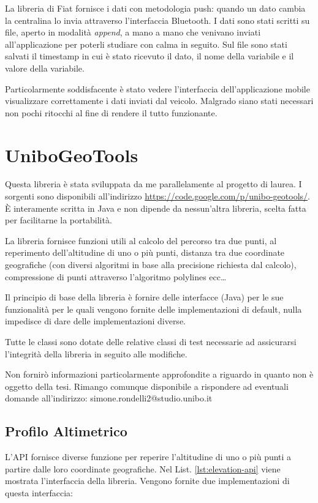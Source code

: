 La libreria di Fiat fornisce i dati con metodologia push: quando un dato cambia la centralina lo invia attraverso l'interfaccia Bluetooth. I dati sono stati scritti su file, aperto in modalità \emph{append}, a mano a mano che venivano inviati all'applicazione per poterli studiare con calma in seguito. Sul file sono stati salvati il timestamp in cui è stato ricevuto il dato, il nome della variabile e il valore della variabile.

Particolarmente soddisfacente è stato vedere l'interfaccia dell'applicazione mobile visualizzare correttamente i dati inviati dal veicolo. Malgrado siano stati necessari non pochi ritocchi al fine di rendere il tutto funzionante. 

\chapter{UniboGeoTools}\label{app:unibo-geo-tools}

Questa libreria è stata sviluppata da me  parallelamente al progetto di laurea. I sorgenti sono disponibili all'indirizzo \url{https://code.google.com/p/unibo-geotools/}. È interamente scritta in Java e non dipende da nessun'altra libreria, scelta fatta per facilitarne la portabilità.

La libreria fornisce funzioni utili al calcolo del percorso tra due punti, al reperimento dell'altitudine di uno o più punti, distanza tra due coordinate geografiche (con diversi algoritmi in base alla precisione richiesta dal calcolo), compressione di punti attraverso l'algoritmo polylines ecc\dots

Il principio di base della libreria è fornire delle interfacce (Java) per le sue funzionalità per le quali vengono fornite delle implementazioni di default, nulla impedisce di dare delle implementazioni diverse.

Tutte le classi sono dotate delle relative classi di test necessarie ad assicurarsi l'integrità della libreria in seguito alle modifiche.

Non fornirò informazioni particolarmente approfondite a riguardo in quanto non è oggetto della tesi. Rimango comunque disponibile a rispondere ad eventuali domande all'indirizzo: simone.rondelli2@studio.unibo.it

\section{Profilo Altimetrico}

L'API fornisce diverse funzione per reperire l'altitudine di uno o più punti a partire dalle loro coordinate geografiche. Nel List. \ref{lst:elevation-api} viene mostrata l'interfaccia della libreria. Vengono fornite due implementazioni di questa interfaccia:

